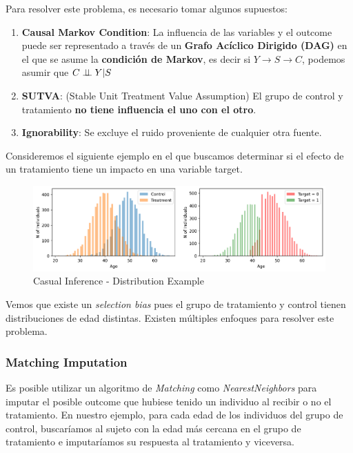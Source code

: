 Para resolver este problema, es necesario tomar algunos supuestos: 
\begin{enumerate}
    \item \textbf{Causal Markov Condition}: La influencia de las variables y el outcome puede ser representado a través de un \textbf{Grafo Acíclico Dirigido (DAG)} en el que se asume la \textbf{condición de Markov}, es decir si $Y \rightarrow S \rightarrow C$, podemos asumir que $C \perp \!\!\! \perp Y | S$
    \item \textbf{SUTVA}: (Stable Unit Treatment Value Assumption) El grupo de control y tratamiento \textbf{no tiene influencia el uno con el otro}. 
    \item \textbf{Ignorability}: Se excluye el ruido proveniente de cualquier otra fuente. 
\end{enumerate}

Consideremos el siguiente ejemplo en el que buscamos determinar si el efecto de un tratamiento tiene un impacto en una variable target. 

\begin{figure}[H]
    \center
    \includegraphics[scale=0.5]{notebooks/STATS/img/causal_inference_age_distribution.png}
    \caption{Casual Inference - Distribution Example}
\end{figure}

Vemos que existe un \textit{selection bias} pues el grupo de tratamiento y control tienen distribuciones de edad distintas. Existen múltiples enfoques para resolver este problema. 

\subsubsection{Matching Imputation}

Es posible utilizar un algoritmo de \textit{Matching} como \textit{NearestNeighbors} para imputar el posible outcome que hubiese tenido un individuo al recibir o no el tratamiento. En nuestro ejemplo, para cada edad de los individuos del grupo de control, buscaríamos al sujeto con la edad más cercana en el grupo de tratamiento e imputaríamos su respuesta al tratamiento y viceversa. 

